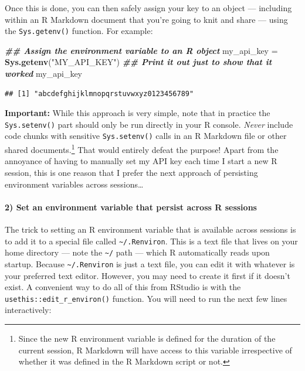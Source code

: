 \documentclass[
]{article}
\newenvironment{Shaded}{\begin{snugshade}}{\end{snugshade}}
\newcommand{\DocumentationTok}[1]{\textcolor[rgb]{0.56,0.35,0.01}{\textbf{\textit{#1}}}}
\newcommand{\FunctionTok}[1]{\textcolor[rgb]{0.13,0.29,0.53}{\textbf{#1}}}
\newcommand{\NormalTok}[1]{#1}
\newcommand{\OtherTok}[1]{\textcolor[rgb]{0.56,0.35,0.01}{#1}}
\newcommand{\StringTok}[1]{\textcolor[rgb]{0.31,0.60,0.02}{#1}}
\begin{document}
Once this is done, you can then safely assign your key to an object ---
including within an R Markdown document that you're going to knit and
share --- using the \texttt{Sys.getenv()} function. For example:

\begin{Shaded}
\begin{Highlighting}[]
\DocumentationTok{\#\# Assign the environment variable to an R object}
\NormalTok{my\_api\_key }\OtherTok{=} \FunctionTok{Sys.getenv}\NormalTok{(}\StringTok{"MY\_API\_KEY"}\NormalTok{)}
\DocumentationTok{\#\# Print it out just to show that it worked}
\NormalTok{my\_api\_key}
\end{Highlighting}
\end{Shaded}

\begin{verbatim}
## [1] "abcdefghijklmnopqrstuvwxyz0123456789"
\end{verbatim}

\textbf{Important:} While this approach is very simple, note that in
practice the \texttt{Sys.setenv()} part should only be run directly in
your R console. \emph{Never} include code chunks with sensitive
\texttt{Sys.setenv()} calls in an R Markdown file or other shared
documents.\footnote{Since the new R environment variable is defined for
  the duration of the current session, R Markdown will have access to
  this variable irrespective of whether it was defined in the R Markdown
  script or not.} That would entirely defeat the purpose! Apart from the
annoyance of having to manually set my API key each time I start a new R
session, this is one reason that I prefer the next approach of
persisting environment variables across sessions\ldots{}

\hypertarget{set-an-environment-variable-that-persist-across-r-sessions}{%
\paragraph{2) Set an environment variable that persist across R
sessions}\label{set-an-environment-variable-that-persist-across-r-sessions}}

The trick to setting an R environment variable that is available across
sessions is to add it to a special file called
\texttt{\textasciitilde{}/.Renviron}. This is a text file that lives on
your home directory --- note the \texttt{\textasciitilde{}/} path ---
which R automatically reads upon startup. Because
\texttt{\textasciitilde{}/.Renviron} is just a text file, you can edit
it with whatever is your preferred text editor. However, you may need to
create it first if it doesn't exist. A convenient way to do all of this
from RStudio is with the \texttt{usethis::edit\_r\_environ()} function.
You will need to run the next few lines interactively:
\end{document}

